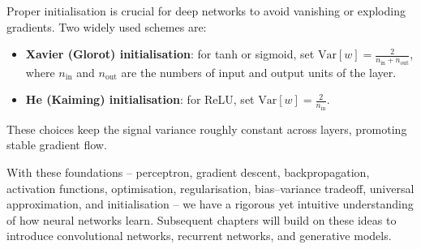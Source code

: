 \documentclass{tufte-handout}
\begin{document}
Proper initialisation is crucial for deep networks to avoid vanishing or exploding gradients. Two widely used schemes are:

\begin{itemize}
    \item \textbf{Xavier (Glorot) initialisation}: for tanh or sigmoid, set $\text{Var}[w] = \frac{2}{n_{\text{in}} + n_{\text{out}}}$, where $n_{\text{in}}$ and $n_{\text{out}}$ are the numbers of input and output units of the layer.
    \item \textbf{He (Kaiming) initialisation}: for ReLU, set $\text{Var}[w] = \frac{2}{n_{\text{in}}}$.
\end{itemize}

These choices keep the signal variance roughly constant across layers, promoting stable gradient flow.

With these foundations – perceptron, gradient descent, backpropagation, activation functions, optimisation, regularisation, bias–variance tradeoff, universal approximation, and initialisation – we have a rigorous yet intuitive understanding of how neural networks learn. Subsequent chapters will build on these ideas to introduce convolutional networks, recurrent networks, and generative models.
\end{document}
